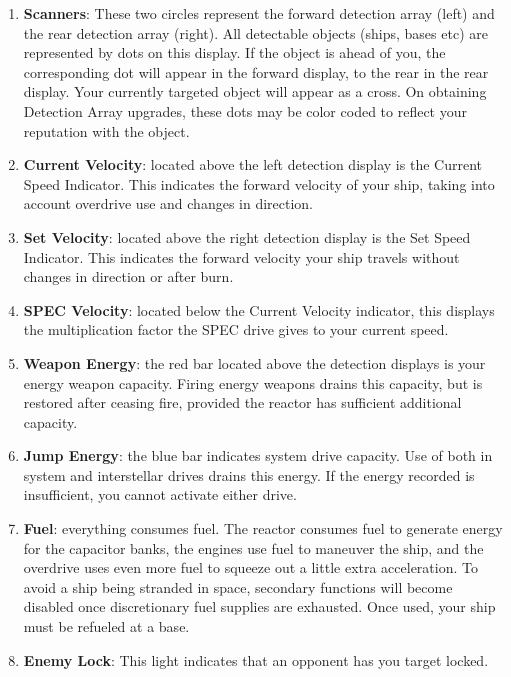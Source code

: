 \documentclass{article}
\begin{document}
\begin{enumerate}
\item  \textbf{Scanners}: These two circles represent the forward detection array (left) and the rear detection array (right). All detectable objects (ships, bases etc) are represented by dots on this display. If the object is ahead of you, the corresponding dot will appear in the forward display, to the rear in the rear display. Your currently targeted object will appear as a cross. On obtaining Detection Array upgrades, these dots may be color coded to reflect your reputation with the object. 

\item  \textbf{Current Velocity}: located above the left detection display is the Current Speed Indicator. This indicates the forward velocity of your ship, taking into account overdrive use and changes in direction. 

\item  \textbf{Set Velocity}: located above the right detection display is the Set Speed Indicator. This indicates the forward velocity your ship travels without changes in direction or after burn. 

\item  \textbf{SPEC Velocity}: located below the Current Velocity indicator, this displays the multiplication factor the SPEC drive gives to your current speed. 

\item  \textbf{Weapon Energy}: the red bar located above the detection displays is your energy weapon capacity. Firing energy weapons drains this capacity, but is restored after ceasing fire, provided the reactor has sufficient additional capacity. 

\item  \textbf{Jump Energy}: the blue bar indicates system drive capacity. Use of both in system and interstellar drives drains this energy. If the energy recorded is insufficient, you cannot activate either drive. 

\item  \textbf{Fuel}: everything consumes fuel. The reactor consumes fuel to generate energy for the capacitor banks, the engines use fuel to maneuver the ship, and the overdrive uses even more fuel to squeeze out a little extra acceleration. To avoid a ship being stranded in space, secondary functions will become disabled once discretionary fuel supplies are exhausted. Once used, your ship must be refueled at a base. 

\item  \textbf{Enemy Lock}: This light indicates that an opponent has you target locked. 
\end{enumerate}
\end{document}
